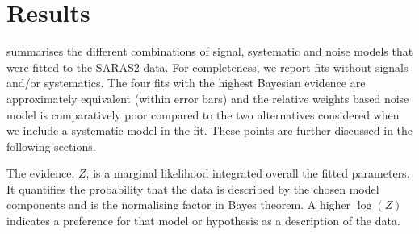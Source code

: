\section{Results}
\label{sec:results_saras2}

 summarises the different combinations of signal, systematic and noise models that were fitted to the SARAS2 data. For completeness, we report fits without signals and/or systematics. The four fits with the highest Bayesian evidence are approximately equivalent (within error bars) and the relative weights based noise model is comparatively poor compared to the two alternatives considered when we include a systematic model in the fit. These points are further discussed in the following sections.

The evidence, $Z$, is a marginal likelihood integrated overall the fitted parameters. It quantifies the probability that the data is described by the chosen model components and is the normalising factor in Bayes theorem. A higher $\log(Z)$ indicates a preference for that model or hypothesis as a description of the data. %

